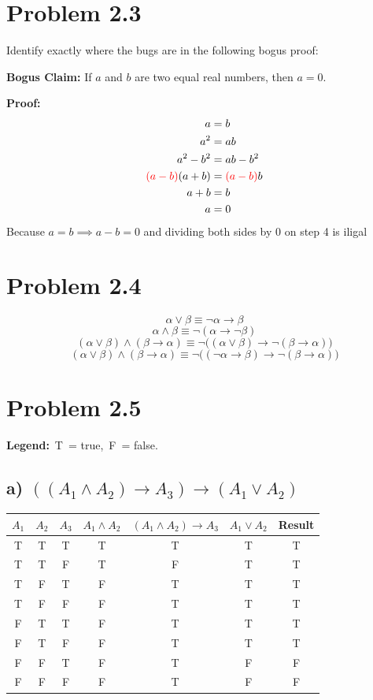 \documentclass[12pt]{article}
\newcommand{\T}{\cellcolor{truegreen}T}
\newcommand{\F}{\cellcolor{falsered}F}
\begin{document}
\section*{Problem 2.3}
Identify exactly where the bugs are in the following bogus proof:

\noindent\textbf{Bogus Claim:} If $a$ and $b$ are two equal real numbers, then $a = 0$.

\noindent\textbf{Proof:}
\begin{align}
a &= b \\
a^2 &= ab \\
a^2 - b^2 &= ab - b^2 \\
\textcolor{red}{(a - b)}(a + b) &= \textcolor{red}{(a - b)}b \\
a + b &= b \\
a &= 0
\end{align}
Because $a=b \implies a-b = 0$ and dividing both sides by 0 on step 4 is iligal



\section*{Problem 2.4}
\[
    \alpha \lor \beta \equiv \neg\alpha \rightarrow \beta
\]
\[
    \alpha \land \beta \equiv \neg(\alpha \rightarrow \neg\beta)
\]
\[
    (\alpha \lor \beta) \land (\beta \rightarrow \alpha)
    \equiv \neg\big((\alpha \lor \beta) \rightarrow \neg(\beta \rightarrow \alpha)\big)
\]
\[
    (\alpha \lor \beta) \land (\beta \rightarrow \alpha)
    \equiv \neg\big((\neg\alpha \rightarrow \beta) \rightarrow \neg(\beta \rightarrow \alpha)\big)
\]

\section*{Problem 2.5}
\noindent\textbf{Legend:} \colorbox{truegreen}{\,T\,} = true, \quad \colorbox{falsered}{\,F\,} = false.
 
\subsection*{a) $((A_1\wedge A_2)\to A_3)\to(A_1\vee A_2)$}
\begin{center}
\renewcommand{\arraystretch}{1.15}
\begin{tabular}{|c|c|c|c|c|c||c|}
\hline
$A_1$ & $A_2$ & $A_3$ & $A_1\wedge A_2$ & $(A_1\wedge A_2)\to A_3$ & $A_1\vee A_2$ & \textbf{Result} \\ \hline
\T & \T & \T & \T & \T & \T & \T \\
\T & \T & \F & \T & \F & \T & \T \\
\T & \F & \T & \F & \T & \T & \T \\
\T & \F & \F & \F & \T & \T & \T \\
\F & \T & \T & \F & \T & \T & \T \\
\F & \T & \F & \F & \T & \T & \T \\
\F & \F & \T & \F & \T & \F & \F \\
\F & \F & \F & \F & \T & \F & \F \\
\hline
\end{tabular}
\end{center}
 
\end{document}
